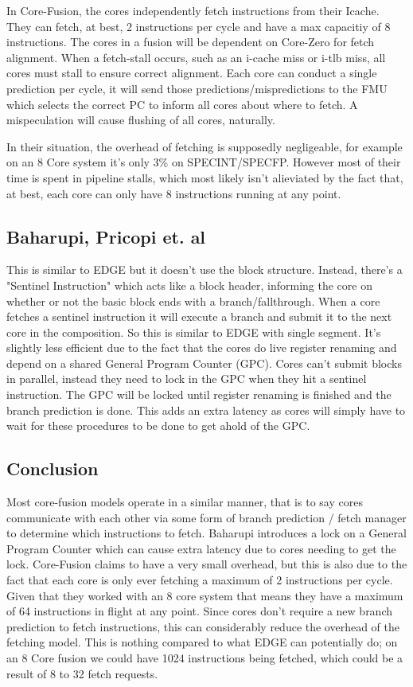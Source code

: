In Core-Fusion, the cores independently fetch instructions from their Icache. They can fetch, at best, 2 instructions per cycle and have a max capacitiy of 8 instructions.
The cores in a fusion will be dependent on Core-Zero for fetch alignment.
When a fetch-stall occurs, such as an i-cache miss or i-tlb miss, all cores must stall to ensure correct alignment.
Each core can conduct a single prediction per cycle, it will send those predictions/mispredictions to the FMU which selects the correct PC to inform all cores about where to fetch.
A mispeculation will cause flushing of all cores, naturally.

In their situation, the overhead of fetching is supposedly negligeable, for example on an 8 Core system it's only 3\% on SPECINT/SPECFP.
However most of their time is spent in pipeline stalls, which most likely isn't alieviated by the fact that, at best, each core can only have 8 instructions running at any point.

\subsection{Baharupi, Pricopi et. al}
This is similar to EDGE but it doesn't use the block structure.
Instead, there's a "Sentinel Instruction" which acts like a block header, informing the core on whether or not the basic block ends with a branch/fallthrough.
When a core fetches a sentinel instruction it will execute a branch and submit it to the next core in the composition.
So this is similar to EDGE with single segment.
It's slightly less efficient due to the fact that the cores do live register renaming and depend on a shared General Program Counter (GPC).
Cores can't submit blocks in parallel, instead they need to lock in the GPC when they hit a sentinel instruction.
The GPC will be locked until register renaming is finished and the branch prediction is done.
This adds an extra latency as cores will simply have to wait for these procedures to be done to get ahold of the GPC.

\subsection{Conclusion}
Most core-fusion models operate in a similar manner, that is to say cores communicate with each other via some form of branch prediction / fetch manager to determine which instructions to fetch.
Baharupi introduces a lock on a General Program Counter which can cause extra latency due to cores needing to get the lock.
Core-Fusion claims to have a very small overhead, but this is also due to the fact that each core is only ever fetching a maximum of 2 instructions per cycle.
Given that they worked with an 8 core system that means they have a maximum of 64 instructions in flight at any point.
Since cores don't require a new branch prediction to fetch instructions, this can considerably reduce the overhead of the fetching model.
This is nothing compared to what EDGE can potentially do; on an 8 Core fusion we could have 1024 instructions being fetched, which could be a result of 8 to 32 fetch requests.

